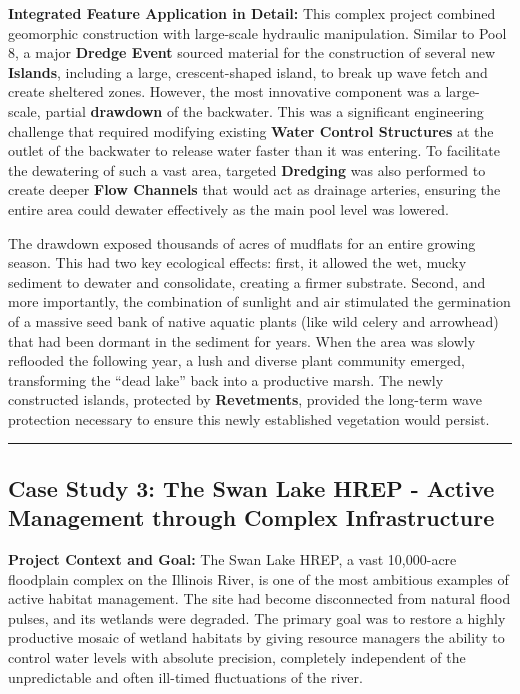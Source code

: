 \documentclass[
  letterpaper,
  DIV=11,
  numbers=noendperiod]{scrreprt}
\begin{document}
\textbf{Integrated Feature Application in Detail:} This complex project
combined geomorphic construction with large-scale hydraulic
manipulation. Similar to Pool 8, a major \textbf{Dredge Event} sourced
material for the construction of several new \textbf{Islands}, including
a large, crescent-shaped island, to break up wave fetch and create
sheltered zones. However, the most innovative component was a
large-scale, partial \textbf{drawdown} of the backwater. This was a
significant engineering challenge that required modifying existing
\textbf{Water Control Structures} at the outlet of the backwater to
release water faster than it was entering. To facilitate the dewatering
of such a vast area, targeted \textbf{Dredging} was also performed to
create deeper \textbf{Flow Channels} that would act as drainage
arteries, ensuring the entire area could dewater effectively as the main
pool level was lowered.

The drawdown exposed thousands of acres of mudflats for an entire
growing season. This had two key ecological effects: first, it allowed
the wet, mucky sediment to dewater and consolidate, creating a firmer
substrate. Second, and more importantly, the combination of sunlight and
air stimulated the germination of a massive seed bank of native aquatic
plants (like wild celery and arrowhead) that had been dormant in the
sediment for years. When the area was slowly reflooded the following
year, a lush and diverse plant community emerged, transforming the
``dead lake'' back into a productive marsh. The newly constructed
islands, protected by \textbf{Revetments}, provided the long-term wave
protection necessary to ensure this newly established vegetation would
persist.

\begin{center}\rule{0.5\linewidth}{0.5pt}\end{center}

\subsection{\texorpdfstring{\textbf{Case Study 3: The Swan Lake HREP -
Active Management through Complex
Infrastructure}}{Case Study 3: The Swan Lake HREP - Active Management through Complex Infrastructure}}\label{case-study-3-the-swan-lake-hrep---active-management-through-complex-infrastructure}

\textbf{Project Context and Goal:} The Swan Lake HREP, a vast
10,000-acre floodplain complex on the Illinois River, is one of the most
ambitious examples of active habitat management. The site had become
disconnected from natural flood pulses, and its wetlands were degraded.
The primary goal was to restore a highly productive mosaic of wetland
habitats by giving resource managers the ability to control water levels
with absolute precision, completely independent of the unpredictable and
often ill-timed fluctuations of the river.
\end{document}
